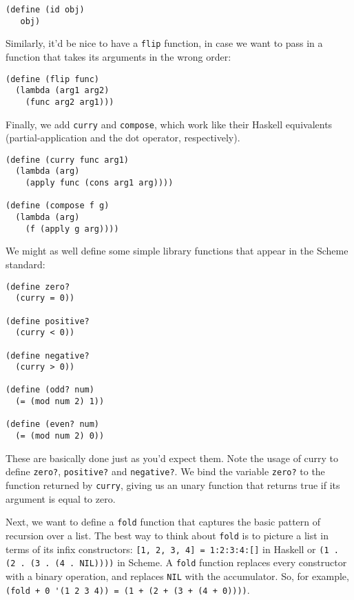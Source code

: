 \begin{lstlisting}
(define (id obj)
   obj)
\end{lstlisting}
 
Similarly, it'd be nice to have a \verb|flip| function, in case we want to pass in a function that takes its arguments in the wrong order:
 
\begin{lstlisting}
(define (flip func)
  (lambda (arg1 arg2)
    (func arg2 arg1)))
\end{lstlisting}
 
Finally, we add \verb|curry| and \verb|compose|, which work like their Haskell equivalents (partial-application and the dot operator, respectively).
 
\begin{lstlisting}
(define (curry func arg1)
  (lambda (arg)
    (apply func (cons arg1 arg))))
 
(define (compose f g)
  (lambda (arg)
    (f (apply g arg))))
\end{lstlisting}
 
We might as well define some simple library functions that appear in the Scheme standard:
 
\begin{lstlisting}
(define zero?
  (curry = 0))
 
(define positive?
  (curry < 0))
 
(define negative?
  (curry > 0))
 
(define (odd? num)
  (= (mod num 2) 1))
 
(define (even? num)
  (= (mod num 2) 0))
\end{lstlisting}
 
These are basically done just as you'd expect them. Note the usage of curry to define \verb|zero?|, \verb|positive?| and \verb|negative?|. We bind the variable \verb|zero?| to the function returned by \verb|curry|, giving us an unary function that returns true if its argument is equal to zero.
 
Next, we want to define a \verb|fold| function that captures the basic pattern of recursion over a list. The best way to think about \verb|fold| is to picture a list in terms of its infix constructors: \lstinline|[1, 2, 3, 4] = 1:2:3:4:[]| in Haskell or \lstinline|(1 . (2 . (3 . (4 . NIL))))| in Scheme. A \verb|fold| function replaces every constructor with a binary operation, and replaces \verb|NIL| with the accumulator. So, for example, \lstinline|(fold + 0 '(1 2 3 4)) = (1 + (2 + (3 + (4 + 0))))|.
 
